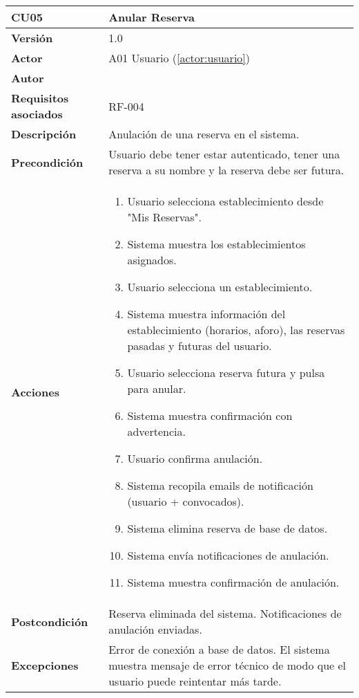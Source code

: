 \begin{table}[H]
	\centering
	\begin{tabularx}{\linewidth}{ p{} p{} }
		\toprule
		\textbf{CU05}    & \textbf{Anular Reserva} \\
		\toprule
		\textbf{Versión}              & 1.0    \\
		\textbf{Actor}                & A01 Usuario (\ref{actor:usuario}) \\
		\textbf{Autor}                & \nombre \\
		\textbf{Requisitos asociados} & RF-004 \\
		\textbf{Descripción}          & Anulación de una reserva en el sistema. \\
		\textbf{Precondición}         & Usuario debe tener estar autenticado, tener una reserva a su nombre y la reserva debe ser futura. \\
		\textbf{Acciones}             &
		\begin{enumerate}
			\def\labelenumi{\arabic{enumi}.}
			\tightlist
			\item Usuario selecciona establecimiento desde "Mis Reservas".
            \item Sistema muestra los establecimientos asignados.
            \item Usuario selecciona un establecimiento.
            \item Sistema muestra información del establecimiento (horarios, aforo), las reservas pasadas y futuras del usuario.
            \item Usuario selecciona reserva futura y pulsa para anular.
            \item Sistema muestra confirmación con advertencia.
            \item Usuario confirma anulación.
            \item Sistema recopila emails de notificación (usuario + convocados).
            \item Sistema elimina reserva de base de datos.
            \item Sistema envía notificaciones de anulación.
            \item Sistema muestra confirmación de anulación.
		\end{enumerate}\\
		\textbf{Postcondición}        & Reserva eliminada del sistema. Notificaciones de anulación enviadas.\\
		\textbf{Excepciones}          &  Error de conexión a base de datos. El sistema muestra mensaje de error técnico de modo que el usuario puede reintentar más tarde.\\

\end{tabularx}
\end{table}
